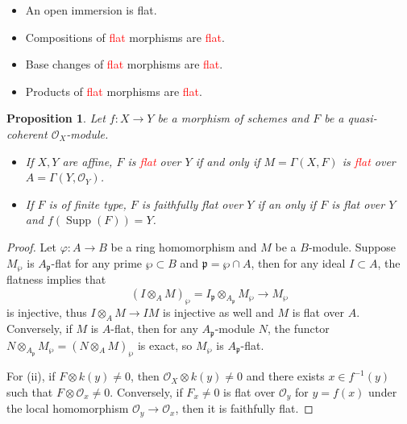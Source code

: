 \documentclass[leqno]{amsart}
\DeclareMathOperator{\Supp}{Supp}
\newcommand{\1}{\mathbf{1}}
\newcommand{\fp}{\mathfrak p}
\newtheorem{prop}[thm]{Proposition}
\theoremstyle{definition}
\theoremstyle{remark}
\newcommand{\red}[1]{\textcolor{Red}{#1}}
\begin{document}
\begin{itemize}
	\item An open immersion is flat.
	\item Compositions of \red{flat} morphisms are \red{flat}.
	\item Base changes of \red{flat} morphisms are \red{flat}.
	\item Products of \red{flat} morphisms are \red{flat}.
\end{itemize}

\begin{prop}
	Let $f\colon X\to Y$ be a morphism of schemes
	and  $F$ be a quasi-coherent $\mathcal{O}_X$-module.
	\begin{itemize}
		\item If $X,Y$ are affine,
		$F$ is \red{flat} over $Y$ if and only if
		$M=\Gamma(X,F)$ is \red{flat}
		over $A=\Gamma(Y,\mathcal{O}_Y)$.
		\item If $F$ is of finite type,
		$F$ is faithfully flat over $Y$
		if an only if $F$ is flat over $Y$
		and $f(\Supp(F))=Y$.
	\end{itemize}
\end{prop}
\begin{proof}
	Let $\varphi\colon A\to B$ be a ring homomorphism
	and  $M$ be a $B$-module.
	Suppose  $M_\wp$ is  $A_\fp$-flat for any prime  $\wp\subset B$
	and  $\fp=\wp\cap A$,
	then for any ideal  $I\subset A$, the flatness implies that
	 \[
		 (I\otimes_AM)_\wp=I_\fp\otimes_{A_\fp}M_\wp\to M_\wp
	\]
	is injective, thus $I\otimes_AM\to IM$ is injective as well
	and $M$ is flat over  $A$.
	Conversely, if  $M$ is  $A$-flat, then for any  $A_\fp$-module  $N$,
	the functor  $N\otimes_{A_\fp}M_\wp=(N\otimes_AM)_\wp$ is exact,
	so $M_\wp$ is  $A_\fp$-flat.

	For (ii), if  $F\otimes k(y)\neq 0$, 
	then  $\mathcal{O}_X\otimes k(y)\neq 0$
	and there exists $x\in f^{-1}(y)$ 
	such that $F\otimes \mathcal{O}_x\neq 0$.
	Conversely, if $F_x\neq0$ is flat over $\mathcal{O}_y$
	for  $y=f(x)$ 
	under the local homomorphism  $\mathcal{O}_y\to \mathcal{O}_x$,
	then it is faithfully flat.
\end{proof}
\end{document}
